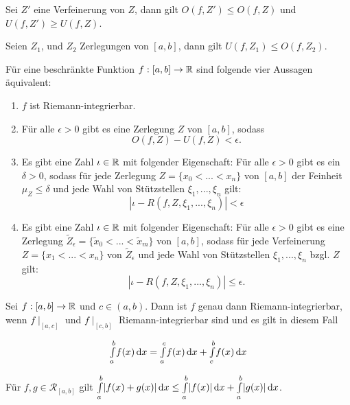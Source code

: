 \documentclass{cheat-sheet}
\begin{document}
\begin{bem}
Sei $Z'$ eine Verfeinerung von $Z$, dann gilt $O(f, Z') \le O(f, Z)$ und $U(f, Z') \ge U(f, Z)$.
\end{bem}

\begin{satz}
Seien $Z_1$, und $Z_2$ Zerlegungen von $[a, b]$, dann gilt $U(f, Z_1) \le O(f, Z_2)$.
\end{satz}

\begin{satz}
Für eine beschränkte Funktion $f : [a, b] \to \mathbb{R}$ sind folgende vier Aussagen äquivalent:

\begin{enumerate}
  \item $f$ ist Riemann-integrierbar.
  \item Für alle $\epsilon > 0$ gibt es eine Zerlegung $Z$ von $[a, b]$, sodass
    \[ O(f, Z) - U(f, Z) < \epsilon. \]
  \item Es gibt eine Zahl $\iota \in \mathbb{R}$ mit folgender Eigenschaft: Für alle $\epsilon > 0$ gibt es ein $\delta > 0$, sodass für jede Zerlegung $Z = \{ x_0 < ... < x_n \}$ von $[a, b]$ der Feinheit $\mu_Z \le \delta$ und jede Wahl von Stützstellen $\xi_1, ..., \xi_n$ gilt:
  \[ |\iota - R(f, Z, \xi_1, ..., \xi_n)| < \epsilon \]
  \item Es gibt eine Zahl $\iota \in \mathbb{R}$ mit folgender Eigenschaft: Für alle $\epsilon > 0$ gibt es eine Zerlegung $\widetilde{Z}_{\epsilon} = \{ \widetilde{x}_0 < ... < \widetilde{x}_m \}$ von $[a, b]$, sodass für jede Verfeinerung $Z = \{ x_1 < ... < x_n \}$ von $\widetilde{Z}_{\epsilon}$ und jede Wahl von Stützstellen $\xi_1, ..., \xi_n$ bzgl. $Z$ gilt:
  \[ | \iota - R(f, Z, \xi_1, ..., \xi_n) | \le \epsilon. \]
\end{enumerate}
\end{satz}


\begin{satz}
Sei $f : [a, b] \to \mathbb{R}$ und $c \in (a, b)$. Dann ist $f$ genau dann Riemann-integrierbar, wenn $f\mid_{[a, c]}$ und $f\mid_{[c, b]}$ Riemann-integrierbar sind und es gilt in diesem Fall

\[{\textstyle \int\limits_{a}^{b}} f(x) \,\mathrm{d} x = {\textstyle \int\limits_{a}^{c}} f(x) \,\mathrm{d} x + {\textstyle \int\limits_{c}^{b}} f(x) \,\mathrm{d} x \]
\end{satz}


\begin{satz}
Für $f, g \in \mathcal{R}_{[a, b]}$ gilt ${\textstyle \int\limits_{a}^{b}} |f(x) + g(x)| \,\mathrm{d} x \le {\textstyle \int\limits_{a}^{b}} |f(x)| \,\mathrm{d} x + {\textstyle \int\limits_{a}^{b}} |g(x)| \,\mathrm{d} x$.
\end{satz}
\end{document}
